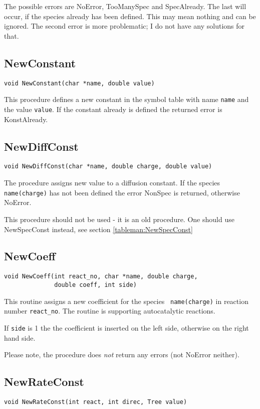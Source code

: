 The possible errors are NoError, TooManySpec and SpecAlready. The last
will occur, if the species already has been defined. This may mean 
nothing and can be ignored. The second error is more problematic; I
do not have any solutions for that.

\subsection{NewConstant}
\begin{verbatim}
void NewConstant(char *name, double value)
\end{verbatim}

This procedure defines a new constant in the symbol table with name 
{\tt name} and the value {\tt value}. If
the constant already is defined the returned error is KonstAlready.

\subsection{NewDiffConst}
\begin{verbatim}
void NewDiffConst(char *name, double charge, double value)
\end{verbatim}

The procedure assigns new value to a diffusion constant. If the species {\tt 
name(charge)} has not been defined the error NonSpec is returned,
otherwise NoError.

This procedure should not be used - it is an old procedure. One should
use NewSpecConst instead, see section \ref{tableman:NewSpecConst}

\subsection{NewCoeff}
\label{newcoeff}
\begin{verbatim}
void NewCoeff(int react_no, char *name, double charge, 
              double coeff, int side)
\end{verbatim}

This routine assigns a new coefficient for the species {\tt
  name(charge)} in reaction number {\tt react\_no}. The routine is 
supporting autocatalytic reactions. 

If {\tt side} is 1 the the coefficient is inserted on the left side,
otherwise on the right hand side.

Please note, the procedure does {\em not} return any errors 
(not NoError neither).

\subsection{NewRateConst}
\begin{verbatim}
void NewRateConst(int react, int direc, Tree value)
\end{verbatim}

